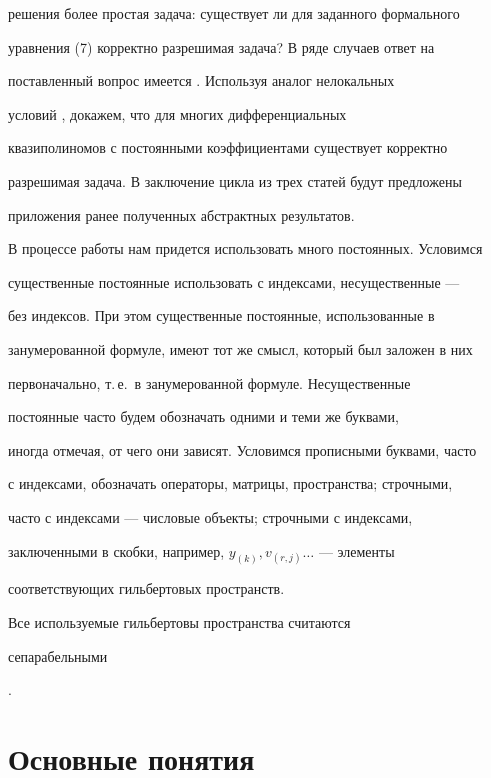 решения более простая задача: существует ли для заданного формального 


уравнения (7) корректно разрешимая задача? В ряде случаев ответ на 


поставленный вопрос имеется \cite{6}. Используя аналог нелокальных 


условий \cite{6}, докажем, что для многих дифференциальных 


квазиполиномов с постоянными коэффициентами существует корректно 


разрешимая задача. В заключение цикла из трех статей будут предложены 


приложения ранее полученных абстрактных результатов. 


 


В процессе работы нам придется использовать много постоянных. Условимся 


существенные постоянные использовать с индексами, несущественные --- 


без индексов. При этом существенные постоянные, использованные в 


занумерованной формуле, имеют тот же смысл, который был заложен в них 


первоначально, т.\,е.~в занумерованной формуле. Несущественные 


постоянные часто будем обозначать одними и теми же буквами, 


иногда отмечая, от чего они зависят. Условимся прописными буквами, часто 


с индексами, обозначать операторы, матрицы, пространства; строчными, 


часто с индексами --- числовые объекты; строчными с индексами, 


заключенными в скобки, например, $y_{(k)},v_{(r,j)}\dotsc$ --- элементы 


соответствующих гильбертовых пространств. 


 


Все используемые гильбертовы пространства считаются {\it 


сепарабельными}. 


 


\section{Основные понятия} 



